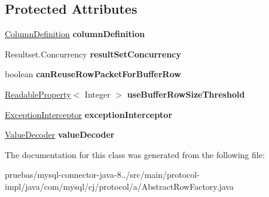 \subsection*{Protected Attributes}
\begin{DoxyCompactItemize}
\item 
\mbox{\label{classcom_1_1mysql_1_1cj_1_1protocol_1_1a_1_1_abstract_row_factory_a7aef40ef79169af177fd41fe37bc4dec}} 
\mbox{\hyperlink{interfacecom_1_1mysql_1_1cj_1_1protocol_1_1_column_definition}{Column\+Definition}} {\bfseries column\+Definition}
\item 
\mbox{\label{classcom_1_1mysql_1_1cj_1_1protocol_1_1a_1_1_abstract_row_factory_ac68967cbb94b27d270217cdd4dec3203}} 
Resultset.\+Concurrency {\bfseries result\+Set\+Concurrency}
\item 
\mbox{\label{classcom_1_1mysql_1_1cj_1_1protocol_1_1a_1_1_abstract_row_factory_adc5a27f2f54c423393f1f118e6bc7d4f}} 
boolean {\bfseries can\+Reuse\+Row\+Packet\+For\+Buffer\+Row}
\item 
\mbox{\label{classcom_1_1mysql_1_1cj_1_1protocol_1_1a_1_1_abstract_row_factory_a1a04c7a5096d1d61dc2a58e50dbf3f33}} 
\mbox{\hyperlink{interfacecom_1_1mysql_1_1cj_1_1conf_1_1_readable_property}{Readable\+Property}}$<$ Integer $>$ {\bfseries use\+Buffer\+Row\+Size\+Threshold}
\item 
\mbox{\label{classcom_1_1mysql_1_1cj_1_1protocol_1_1a_1_1_abstract_row_factory_ae5096f00f7c263d6bb5fcd2a710e82ad}} 
\mbox{\hyperlink{interfacecom_1_1mysql_1_1cj_1_1exceptions_1_1_exception_interceptor}{Exception\+Interceptor}} {\bfseries exception\+Interceptor}
\item 
\mbox{\label{classcom_1_1mysql_1_1cj_1_1protocol_1_1a_1_1_abstract_row_factory_a7eaae01dda1379db83fbf4076eab67df}} 
\mbox{\hyperlink{interfacecom_1_1mysql_1_1cj_1_1protocol_1_1_value_decoder}{Value\+Decoder}} {\bfseries value\+Decoder}
\end{DoxyCompactItemize}


The documentation for this class was generated from the following file\+:\begin{DoxyCompactItemize}
\item 
pruebas/mysql-\/connector-\/java-\/8../src/main/protocol-\/impl/java/com/mysql/cj/protocol/a/Abstract\+Row\+Factory.\+java\end{DoxyCompactItemize}
